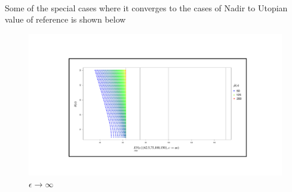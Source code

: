    \begin{figure}[h!]
    \centering 
    \\
\end{figure}

Some of the special cases where it converges to the cases of Nadir to Utopian value of reference is shown below

\begin{figure}[h!]
    \centering
    \includegraphics[scale=0.3]{Chapter5/Pictures/EV_inf}
    \caption{ $\epsilon \rightarrow \infty$}
    \label{fig:EV_1.5}
\end{figure}

